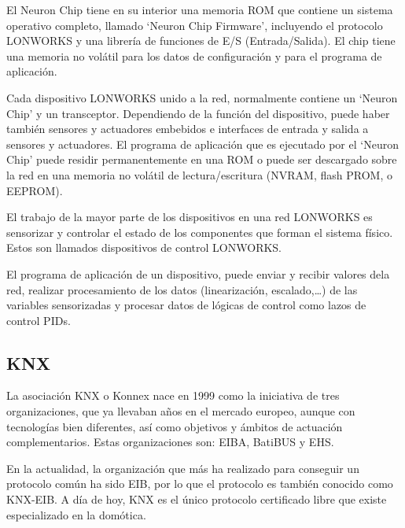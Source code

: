 El Neuron Chip tiene en su interior una memoria ROM que contiene un sistema operativo completo, llamado ‘Neuron Chip Firmware’, incluyendo el protocolo LONWORKS y una librería de funciones de E/S (Entrada/Salida). El chip tiene una memoria no vol\'atil para los datos de configuración y para el programa de aplicación.


Cada dispositivo LONWORKS unido a la red, normalmente contiene un ‘Neuron Chip’ y un transceptor. Dependiendo de la función del dispositivo, puede haber también sensores y actuadores embebidos e interfaces de entrada y salida a sensores y actuadores. El programa de aplicación que es ejecutado por el ‘Neuron Chip’ puede residir permanentemente en una ROM o puede ser descargado sobre la red en una memoria no vol\'atil de lectura/escritura (NVRAM, flash PROM, o EEPROM).


El trabajo de la mayor parte de los dispositivos en una red LONWORKS es sensorizar y controlar el estado de los componentes que forman el sistema físico. Estos son llamados dispositivos de control LONWORKS.


El programa de aplicación de un dispositivo, puede enviar y recibir valores dela red, realizar procesamiento de los datos (linearización, escalado,…) de las variables sensorizadas y procesar datos de lógicas de control como lazos de control PIDs.

\subsection{KNX}
La asociación KNX o Konnex nace en 1999 como la iniciativa de tres organizaciones, que ya llevaban años en el mercado europeo, aunque con tecnologías bien diferentes, así como objetivos y \'ambitos de actuación complementarios. Estas organizaciones son: EIBA, BatiBUS y EHS.


En la actualidad, la organización que m\'as ha realizado para conseguir un protocolo común ha sido EIB, por lo que el protocolo es también conocido como KNX-EIB. A día de hoy, KNX es el único protocolo certificado libre que existe especializado en la domótica.


